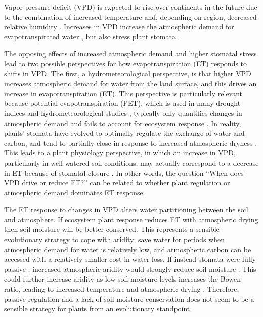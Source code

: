 Vapor pressure deficit (VPD) is expected to rise over continents in
the future due to the combination of increased temperature and,
depending on region, decreased relative humidity
\citep{Byrne_2013}. Increases in VPD increase the atmospheric demand
for evapotranspirated water \citep{Penman_1948, Monteith_1965}, but
also stress plant stomata \citep{Leuning_1990, MEDLYN_2011}.

The opposing effects of increased atmospheric demand and higher
stomatal stress lead to two possible perspectives for how
evapotranspiration (ET) responds to shifts in VPD. The first, a
hydrometeorological perspective, is that higher VPD increases
atmospheric demand for water from the land surface, and this drives an
increase in evapotranspiration (ET). This perspective is particularly
relevant because potential evapotranspiration (PET), which is used in
many drought indices and hydrometeorological studies
\citep[e.g.,][]{Heim_2002, Scheff_2015}, typically only quantifies
changes in atmospheric demand and fails to account for ecosystem
response \citep{Swann_2016}. In reality, plants' stomata have evolved
to optimally regulate the exchange of water and carbon, and tend to
partially close in response to increased atmospheric dryness
\citep{Farquhar_1978, Ball_1987, Leuning_1990, MEDLYN_2011}. This
leads to a plant physiology perspective, in which an increase in VPD,
particularly in well-watered soil conditions, may actually correspond
to a decrease in ET because of stomatal closure
\citep[e.g.][]{Rigden_2017}.  In other words, the question ``When does
VPD drive or reduce ET?'' can be related to whether plant regulation
or atmospheric demand dominates ET response.

The ET response to changes in VPD alters water partitioning between
the soil and atmosphere. If ecosystem plant response reduces ET with
atmospheric drying then soil moisture will be better conserved. This
represents a sensible evolutionary strategy to cope with aridity: save
water for periods when atmospheric demand for water is relatively low,
and atmospheric carbon can be accessed with a relatively smaller cost
in water loss. If instead stomata were fully passive \citep [similar
to soil pores, e.g. ][]{Or_2013}, increased atmospheric aridity would
strongly reduce soil moisture \citep{Berg_2017}. This could further
increase aridity as low soil moisture levels increases the Bowen
ratio, leading to increased temperature and atmospheric drying
\citep[][]{Bouchet_1963, Morton_1965, Brutsaert_1999, Ozdogan_2006,
  Salvucci_2013, Gentine_2016, Berg_2016}. Therefore, passive
regulation and a lack of soil moisture conservation does not seem to
be a sensible strategy for plants from an evolutionary standpoint.

